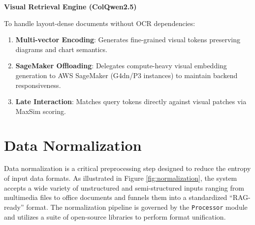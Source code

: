 \textbf{Visual Retrieval Engine (ColQwen2.5)}

To handle layout-dense documents without OCR dependencies:
\begin{enumerate}
    \item \textbf{Multi-vector Encoding}: Generates fine-grained visual tokens preserving diagrams and chart semantics.
    \item \textbf{SageMaker Offloading}: Delegates compute-heavy visual embedding generation to AWS SageMaker (G4dn/P3 instances) to maintain backend responsiveness.
    \item \textbf{Late Interaction}: Matches query tokens directly against visual patches via MaxSim scoring.
\end{enumerate}



\section{Data Normalization}

Data normalization is a critical preprocessing step designed to reduce the entropy of input data formats. As illustrated in Figure \ref{fig:normalization}, the system accepts a wide variety of unstructured and semi-structured inputs ranging from multimedia files to office documents and funnels them into a standardized ``RAG-ready'' format.
The normalization pipeline is governed by the \texttt{Processor} module and utilizes a suite of open-source libraries to perform format unification.

